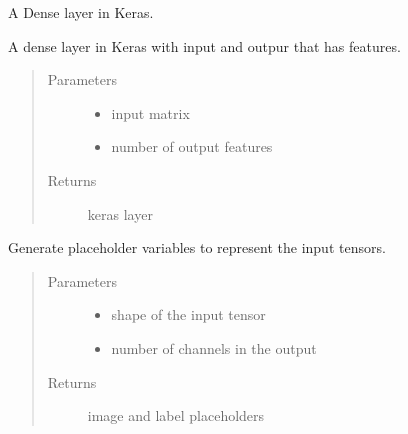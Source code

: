 \documentclass[letterpaper,10pt,english]{sphinxmanual}
\begin{document}
\begin{fulllineitems}
\label{\detokenize{index:boundary.ops.dense_layer}}
A Dense layer in Keras.

A dense layer in Keras with input  and outpur that has  features.
\begin{quote}\begin{description}
\item[{Parameters}] \leavevmode\begin{itemize}
\item {} 
 \textendash{} input matrix

\item {} 
 \textendash{} number of output features

\end{itemize}

\item[{Returns}] \leavevmode
keras layer

\end{description}\end{quote}

\end{fulllineitems}


\begin{fulllineitems}
\label{\detokenize{index:boundary.ops.placeholder_inputs}}
Generate placeholder variables to represent the input tensors.
\begin{quote}\begin{description}
\item[{Parameters}] \leavevmode\begin{itemize}
\item {} 
 \textendash{} shape of the input tensor

\item {} 
 \textendash{} number of channels in the output

\end{itemize}

\item[{Returns}] \leavevmode
image and label placeholders

\end{description}\end{quote}

\end{fulllineitems}
\end{document}

